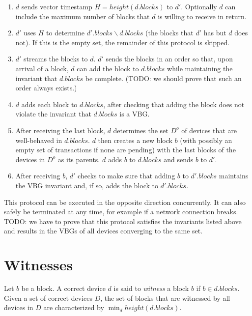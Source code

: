 \documentclass{article}
\begin{document}
\begin{enumerate}
\item $d$ sends vector timestamp $H = \mathit{height}(d.\mathit{blocks})$ to $d'$.  Optionally $d$ can include the maximum number of blocks that $d$ is willing to receive in return.
\item $d'$ uses $H$ to determine $d'.\mathit{blocks} \backslash d.\mathit{blocks}$ (the blocks that $d'$ has but $d$ does not).  If this is the empty set, the remainder of this protocol is skipped.
\item $d'$ streams the blocks to $d$.  $d'$ sends the blocks in an order so that, upon arrival of a block, $d$ can add the block to $d.\mathit{blocks}$ while maintaining the invariant that $d.\mathit{blocks}$ be complete.  (TODO: we should prove that such an order always exists.)
\item $d$ adds each block to $d.\mathit{blocks}$, after checking that adding the block does not violate
the invariant that $d.\mathit{blocks}$ is a VBG.
\item After receiving the last block, $d$ determines the set $D^o$ of devices that are well-behaved in $d.\mathit{blocks}$.  $d$ then creates a new block $b$ (with possibly an empty set of transactions if none are pending) with the last blocks of the devices in $D^o$ as its parents.  $d$ adds $b$ to $d.\mathit{blocks}$ and sends $b$ to $d'$.
\item After receiving $b$, $d'$ checks to make sure that adding $b$ to $d'.\mathit{blocks}$ maintains the VBG invariant and, if so, adds the block to $d'.\mathit{blocks}$.
\end{enumerate}

This protocol can be executed in the opposite direction concurrently.
It can also safely be terminated at any time, for example if a network connection breaks.
TODO: we have to prove that this protocol satisfies the invariants listed above and results in
the VBGs of all devices converging to the same set.

\section{Witnesses}

Let $b$ be a block.  A correct device $d$ is said to \emph{witness} a block $b$ if $b \in d.\mathit{blocks}$.
Given a set of correct devices $D$, the set of blocks that are witnessed by all devices in $D$ are
characterized by $\min_d \mathit{height}(d.\mathit{blocks})$.
\end{document}
